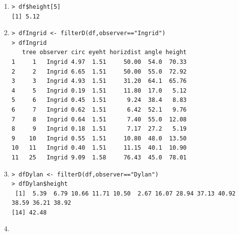 \documentclass[10pt,openany]{book}\usepackage[]{graphicx}\usepackage[]{color}
\makeatletter
\newenvironment{kframe}{%
 \def\at@end@of@kframe{}%
 \ifinner\ifhmode%
  \def\at@end@of@kframe{\end{minipage}}%
  \begin{minipage}{\columnwidth}%
 \fi\fi%
 \def\FrameCommand##1{\hskip\@totalleftmargin \hskip-\fboxsep
 \colorbox{shadecolor}{##1}\hskip-\fboxsep
     \hskip-\linewidth \hskip-\@totalleftmargin \hskip\columnwidth}%
 \MakeFramed {\advance\hsize-\width
   \@totalleftmargin\z@ \linewidth\hsize
   \@setminipage}}%
 {\par\unskip\endMakeFramed%
 \at@end@of@kframe}
\newenvironment{knitrout}{}{} %
\makeatother
\begin{document}
\begin{itemize}
\begin{enumerate}
\begin{knitrout}
\begin{kframe}
\begin{verbatim}
\end{verbatim}
\end{kframe}
\end{knitrout}
      \item
\begin{knitrout}
\color{fgcolor}\begin{kframe}
\begin{verbatim}
> df$height[5]
[1] 5.12
\end{verbatim}
\end{kframe}
\end{knitrout}
      \item
\begin{knitrout}
\color{fgcolor}\begin{kframe}
\begin{verbatim}
> dfIngrid <- filterD(df,observer=="Ingrid")
> dfIngrid
   tree observer circ eyeht horizdist angle height
1     1   Ingrid 4.97  1.51     50.00  54.0  70.33
2     2   Ingrid 6.65  1.51     50.00  55.0  72.92
3     3   Ingrid 4.93  1.51     31.20  64.1  65.76
4     5   Ingrid 0.19  1.51     11.80  17.0   5.12
5     6   Ingrid 0.45  1.51      9.24  38.4   8.83
6     7   Ingrid 0.62  1.51      6.42  52.1   9.76
7     8   Ingrid 0.64  1.51      7.40  55.0  12.08
8     9   Ingrid 0.18  1.51      7.17  27.2   5.19
9    10   Ingrid 0.55  1.51     10.80  48.0  13.50
10   11   Ingrid 0.40  1.51     11.15  40.1  10.90
11   25   Ingrid 9.09  1.58     76.43  45.0  78.01
\end{verbatim}
\end{kframe}
\end{knitrout}
      \item
\begin{knitrout}
\color{fgcolor}\begin{kframe}
\begin{verbatim}
> dfDylan <- filterD(df,observer=="Dylan")
> dfDylan$height
 [1]  5.39  6.79 10.66 11.71 10.50  2.67 16.07 28.94 37.13 40.92 38.59 36.21 38.92
[14] 42.48
\end{verbatim}
\end{kframe}
\end{knitrout}
      \item
\begin{knitrout}
\color{fgcolor}\begin{kframe}
\begin{verbatim}

\end{verbatim}
\end{kframe}
\end{knitrout}
\end{enumerate}
\end{itemize}
\end{document}
